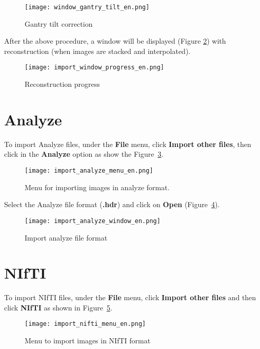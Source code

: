 \begin{figure}[!htb]
\centering
\texttt{[image: window\_gantry\_tilt\_en.png]}
\caption{Gantry tilt correction}
\label{fig:gantry_tilt}
\end{figure}

After the above procedure, a window will be displayed (Figure \ref{fig:prog_recons}) with reconstruction (when images are stacked and interpolated).

\begin{figure}[!htb]
\centering
\texttt{[image: import\_window\_progress\_en.png]} 
\caption{Reconstruction progress}
\label{fig:prog_recons}
\end{figure}

\newpage

\section{Analyze}

To import Analyze files, under the \textbf{File} menu, click \textbf{Import other files}, then click in the \textbf{Analyze} option as show the Figure~\ref{fig:analyze_menu}.

\begin{figure}[!htb]
\centering
\texttt{[image: import\_analyze\_menu\_en.png]}
\caption{Menu for importing images in analyze format.}
\label{fig:analyze_menu}
\end{figure}

Select the Analyze file format (\textbf{.hdr}) and click on \textbf{Open} (Figure~\ref{fig:analyze_import}).
 
\begin{figure}[!htb]
\centering
\texttt{[image: import\_analyze\_window\_en.png]}
\caption{Import analyze file format}
\label{fig:analyze_import}
\end{figure}

\section{NIfTI}

To import NIfTI files, under the \textbf{File}  menu, click \textbf{Import other files} and then click \textbf{NIfTI} as shown in Figure~\ref{fig:import_nifti_menu_pt}.


\begin{figure}[!htb]
\centering
\texttt{[image: import\_nifti\_menu\_en.png]}
\caption{Menu to import images in NIfTI format}
\label{fig:import_nifti_menu_pt}
\end{figure}

